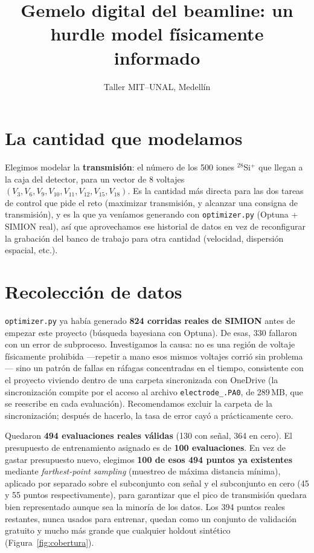 \documentclass[11pt]{article}
\title{Gemelo digital del beamline: un hurdle model físicamente informado}
\author{Taller MIT--UNAL, Medellín}
\date{}
\begin{document}
\maketitle

\section{La cantidad que modelamos}

Elegimos modelar la \textbf{transmisión}: el número de los 500 iones $^{28}$Si$^+$ que
llegan a la caja del detector, para un vector de 8 voltajes
$(V_3, V_6, V_9, V_{10}, V_{11}, V_{12}, V_{15}, V_{18})$. Es la cantidad más directa
para las dos tareas de control que pide el reto (maximizar transmisión, y alcanzar una
consigna de transmisión), y es la que ya veníamos generando con
\texttt{optimizer.py} (Optuna + SIMION real), así que aprovechamos ese historial de datos
en vez de reconfigurar la grabación del banco de trabajo para otra cantidad (velocidad,
dispersión espacial, etc.).

\section{Recolección de datos}

\texttt{optimizer.py} ya había generado \textbf{824 corridas reales de SIMION} antes de
empezar este proyecto (búsqueda bayesiana con Optuna). De esas, 330 fallaron con un error
de subproceso. Investigamos la causa: no es una región de voltaje físicamente prohibida
—repetir a mano esos mismos voltajes corrió sin problema— sino un patrón de fallas en
ráfagas concentradas en el tiempo, consistente con el proyecto viviendo dentro de una
carpeta sincronizada con OneDrive (la sincronización compite por el acceso al archivo
\texttt{electrode\_.PA0}, de 289\,MB, que se reescribe en cada evaluación). Recomendamos
excluir la carpeta de la sincronización; después de hacerlo, la tasa de error cayó a
prácticamente cero.

Quedaron \textbf{494 evaluaciones reales válidas} (130 con señal, 364 en cero). El
presupuesto de entrenamiento asignado es de \textbf{100 evaluaciones}. En vez de gastar
presupuesto nuevo, elegimos \textbf{100 de esos 494 puntos ya existentes} mediante
\emph{farthest-point sampling} (muestreo de máxima distancia mínima), aplicado por
separado sobre el subconjunto con señal y el subconjunto en cero (45 y 55 puntos
respectivamente), para garantizar que el pico de transmisión quedara bien representado
aunque sea la minoría de los datos. Los 394 puntos reales restantes, nunca usados para
entrenar, quedan como un conjunto de validación gratuito y mucho más grande que cualquier
holdout sintético (Figura~\ref{fig:cobertura}).
\end{document}
